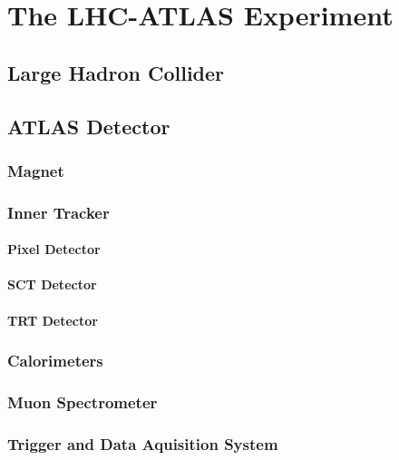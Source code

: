 \chapter{The LHC-ATLAS Experiment}
\section{Large Hadron Collider}
\section{ATLAS Detector}

\subsection{Magnet}
\subsection{Inner Tracker}
\subsubsection{Pixel Detector}
\subsubsection{SCT Detector}
\subsubsection{TRT Detector}
\subsection{Calorimeters}
\subsection{Muon Spectrometer}
\subsection{Trigger and Data Aquisition System}